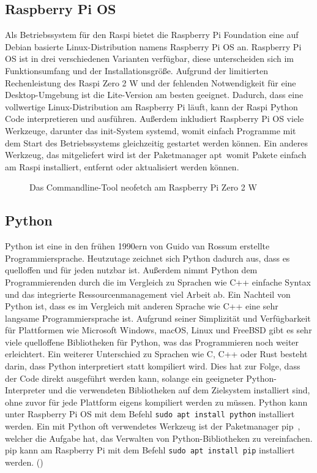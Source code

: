 \subsection{Raspberry Pi OS}
\label{subsec:tRasPiOS}
Als Betriebssystem für den \ac{Raspi} bietet die Raspberry Pi Foundation eine auf Debian basierte Linux-Distribution namens Raspberry Pi \ac{OS} an. Raspberry Pi \ac{OS} ist in drei verschiedenen Varianten verfügbar, diese unterscheiden sich im Funktionsumfang und der Installationsgröße. Aufgrund der limitierten Rechenleistung des \ac{Raspi} Zero 2 W und der fehlenden Notwendigkeit für eine Desktop-Umgebung ist die Lite-Version am besten geeignet. Dadurch, dass eine vollwertige Linux-Distribution am Raspberry Pi läuft, kann der \ac{Raspi} Python Code interpretieren und ausführen. Außerdem inkludiert Raspberry Pi OS viele Werkzeuge, darunter das init-System \glqq systemd\grqq , womit einfach Programme mit dem Start des Betriebssystems gleichzeitig gestartet werden können. Ein anderes Werkzeug, das mitgeliefert wird ist der Paketmanager \glqq apt\grqq\ womit Pakete einfach am \ac{Raspi} installiert, entfernt oder aktualisiert werden können.
\begin{figure}[h]
\centering
\missingfigure{}
\caption{Das Commandline-Tool neofetch am Raspberry Pi Zero 2 W}
\label{fig:pineofetch}
\end{figure}

\subsection{Python}
\label{subsec:tPython}
Python ist eine in den frühen 1990ern von Guido van Rossum erstellte Programmiersprache. Heutzutage zeichnet sich Python dadurch aus, dass es quelloffen und für jeden nutzbar ist. Außerdem nimmt Python dem Programmierenden durch die im Vergleich zu Sprachen wie C++ einfache Syntax und das integrierte Ressourcenmanagement viel Arbeit ab. Ein Nachteil von Python ist, dass es im Vergleich mit anderen Sprache wie C++ eine sehr langsame Programmiersprache ist. Aufgrund seiner Simplizität und Verfügbarkeit für Plattformen wie Microsoft Windows, macOS, Linux und FreeBSD gibt es sehr viele quelloffene Bibliotheken für Python, was das Programmieren noch weiter erleichtert. Ein weiterer Unterschied zu Sprachen wie C, C++ oder Rust besteht darin, dass Python interpretiert statt kompiliert wird. Dies hat zur Folge, dass der Code direkt ausgeführt werden kann, solange ein geeigneter Python-Interpreter und die verwendeten Bibliotheken auf dem Zielsystem installiert sind, ohne zuvor für jede Plattform eigens kompiliert werden zu müssen. Python kann unter Raspberry Pi OS mit dem Befehl \verb|sudo apt install python| installiert werden. Ein mit Python oft verwendetes Werkzeug ist der Paketmanager \glqq pip\grqq\ , welcher die Aufgabe hat, das Verwalten von Python-Bibliotheken zu vereinfachen. pip kann am Raspberry Pi mit dem Befehl \verb|sudo apt install pip| installiert werden.
(\cite{matthes-2019})

